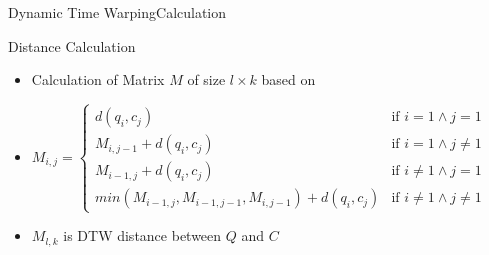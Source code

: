 \begin{frame}{Dynamic Time Warping}{Calculation}
    \begin{block}{Distance Calculation}
        \begin{itemize}
            \item Calculation of Matrix $M$ of size $l \times k$ based on \cite{sart2010accelerating}
            \pause
            \item {\small $M_{i, j} = \begin{cases}
                d(q_i,c_j) & \text{if } i = 1 \wedge j = 1\\
                M_{i,j-1} + d(q_i,c_j) & \text{if } i = 1 \wedge j \neq 1\\
                M_{i-1,j} + d(q_i,c_j) & \text{if } i \neq 1 \wedge j = 1\\
                min(M_{i-1,j}, M_{i-1,j-1}, M_{i,j-1}) + d(q_i,c_j) & \text{if } i \neq 1 \wedge j \neq 1
            \end{cases}$ }
            \pause
            \item $M_{l,k}$ is DTW distance between $Q$ and $C$
        \end{itemize}
    \end{block}
\end{frame}

